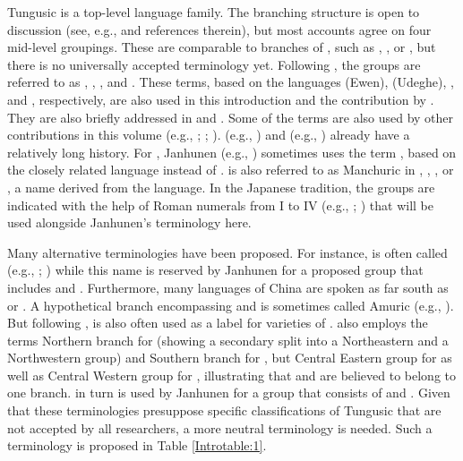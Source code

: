 \documentclass[output=paper,colorlinks,citecolor=brown]{langscibook}
\begin{document}
Tungusic is a top-level language family. The branching structure is open to discussion (see, e.g., \citealt{WhaleyOskolskaya2020} and references therein), but most accounts agree on four mid-level groupings. These are comparable to branches of , such as , , or , but there is no universally accepted terminology yet. Following \citet{Janhunen2012a}, the groups are referred to as , , , and . These terms, based on the languages  (Ewen),  (Udeghe), , and , respectively, are also used in this introduction and the contribution by . They are also briefly addressed in  and . Some of the terms are also used by other contributions in this volume (e.g., ; ; ).  (e.g., \citealt{Janhunen1996}) and  (e.g., \citealt{Georg2004}) already have a relatively long history. For , Janhunen (e.g., \citeyear{Janhunen2015}) sometimes uses the term , based on the closely related language  instead of .  is also referred to as Manchuric in \citet{Alonso2010}, \citet{Jang2020}, , or , a name derived from the  language. In the Japanese tradition, the groups are indicated with the help of Roman numerals from I to IV (e.g., \citealt{Ikegami1974}; \citealt{Kazama2003}) that will be used alongside Janhunen’s terminology here.

Many alternative terminologies have been proposed. For instance,  is often called  (e.g., ; ) while this name is reserved by Janhunen for a proposed group that includes  and . Furthermore, many  languages of China are spoken as far south as  or . A hypothetical branch encompassing  and  is sometimes called Amuric (e.g., ). But following \citet{Janhunen1996},  is also often used as a label for varieties of . \citet[5]{Doerfer1978} also employs the terms Northern branch for  (showing a secondary split into a Northeastern and a Northwestern group) and Southern branch for , but Central Eastern group for  as well as Central Western group for , illustrating that  and  are believed to belong to one branch.  in turn is used by Janhunen for a group that consists of  and . Given that these terminologies presuppose specific classifications of Tungusic that are not accepted by all researchers, a more neutral terminology is needed. Such a terminology is proposed in Table \ref{Introtable:1}.
\end{document}
